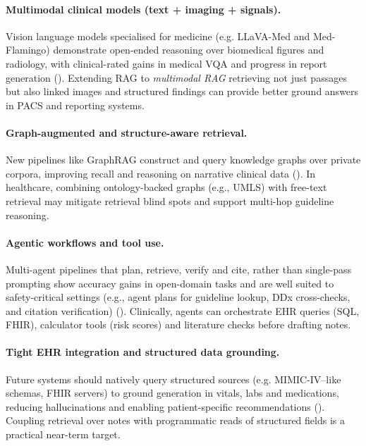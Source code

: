 \paragraph{Multimodal clinical models (text + imaging + signals).}
Vision language models specialised for medicine (e.g. LLaVA-Med and Med-Flamingo) demonstrate open-ended reasoning over biomedical figures and radiology, with clinical-rated gains in medical VQA and progress in report generation (\citep{llavamed2023,moor2023medflamingo,nature2024flamingocxr}). Extending RAG to \emph{multimodal RAG} retrieving not just passages but also linked images and structured findings can provide better ground answers in PACS and reporting systems.

\paragraph{Graph-augmented and structure-aware retrieval.}
New pipelines like GraphRAG construct and query knowledge graphs over private corpora, improving recall and reasoning on narrative clinical data (\citep{larson2024graphrag,graphrag2024arxiv}). In healthcare, combining ontology-backed graphs (e.g., UMLS) with free-text retrieval may mitigate retrieval blind spots and support multi-hop guideline reasoning.

\paragraph{Agentic workflows and tool use.}
Multi-agent pipelines that plan, retrieve, verify and cite, rather than single-pass prompting show accuracy gains in open-domain tasks and are well suited to safety-critical settings (e.g., agent plans for guideline lookup, DDx cross-checks, and citation verification) (\citep{sun2025agenticrag}). Clinically, agents can orchestrate EHR queries (SQL, FHIR), calculator tools (risk scores) and literature checks before drafting notes.

\paragraph{Tight EHR integration and structured data grounding.}
Future systems should natively query structured sources (e.g. MIMIC-IV–like schemas, FHIR servers) to ground generation in vitals, labs and medications, reducing hallucinations and enabling patient-specific recommendations (\citep{yang2022gatortron}). Coupling retrieval over notes with programmatic reads of structured fields is a practical near-term target.

